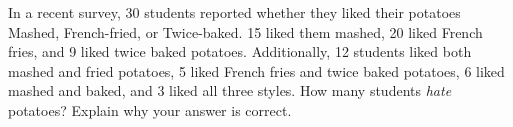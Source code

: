 \begin{questions}


\question In a recent survey, 30 students reported whether they liked their potatoes Mashed, French-fried, or Twice-baked. 15 liked them mashed, 20 liked French fries, and 9 liked twice baked potatoes. Additionally, 12 students liked both mashed and fried potatoes, 5 liked French fries and twice baked potatoes, 6 liked mashed and baked, and 3 liked all three styles. How many students
{\em hate} potatoes?  Explain why your answer is correct.





\end{questions}
